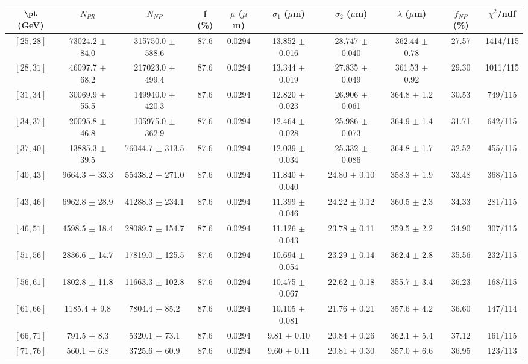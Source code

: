 \begin{tabular}{c||c|c|c|c|c|c|c||c|c}
$\pt$ (GeV) & $N_{PR}$ & $N_{NP}$ & f (\%) & $\mu$ ($\mu$m) & $\sigma_1$ ($\mu$m) & $\sigma_2$ ($\mu$m)  & $\lambda$ ($\mu$m) & $f_{NP}$ (\%) & $\chi^2$/ndf \\
\hline
$[25, 28]$ & 73024.2 $\pm$ 84.0 & 315750.0 $\pm$ 588.6 & 87.6 & 0.0294 & 13.852 $\pm$ 0.016 & 28.747 $\pm$ 0.040 & 362.44 $\pm$ 0.78 & 27.57 & 1414/115\\
$[28, 31]$ & 46097.7 $\pm$ 68.2 & 217023.0 $\pm$ 499.4 & 87.6 & 0.0294 & 13.344 $\pm$ 0.019 & 27.835 $\pm$ 0.049 & 361.53 $\pm$ 0.92 & 29.30 & 1011/115\\
$[31, 34]$ & 30069.9 $\pm$ 55.5 & 149940.0 $\pm$ 420.3 & 87.6 & 0.0294 & 12.820 $\pm$ 0.023 & 26.906 $\pm$ 0.061 & 364.8 $\pm$ 1.2 & 30.53 & 749/115\\
$[34, 37]$ & 20095.8 $\pm$ 46.8 & 105975.0 $\pm$ 362.9 & 87.6 & 0.0294 & 12.464 $\pm$ 0.028 & 25.986 $\pm$ 0.073 & 364.9 $\pm$ 1.4 & 31.71 & 642/115\\
$[37, 40]$ & 13885.3 $\pm$ 39.5 & 76044.7 $\pm$ 313.5 & 87.6 & 0.0294 & 12.039 $\pm$ 0.034 & 25.332 $\pm$ 0.086 & 364.8 $\pm$ 1.7 & 32.52 & 455/115\\
$[40, 43]$ & 9664.3 $\pm$ 33.3 & 55438.2 $\pm$ 271.0 & 87.6 & 0.0294 & 11.840 $\pm$ 0.040 & 24.80 $\pm$ 0.10 & 358.3 $\pm$ 1.9 & 33.48 & 368/115\\
$[43, 46]$ & 6962.8 $\pm$ 28.9 & 41288.3 $\pm$ 234.1 & 87.6 & 0.0294 & 11.399 $\pm$ 0.046 & 24.22 $\pm$ 0.12 & 360.5 $\pm$ 2.3 & 34.33 & 281/115\\
$[46, 51]$ & 4598.5 $\pm$ 18.4 & 28089.7 $\pm$ 154.7 & 87.6 & 0.0294 & 11.126 $\pm$ 0.043 & 23.78 $\pm$ 0.11 & 359.5 $\pm$ 2.2 & 34.90 & 307/115\\
$[51, 56]$ & 2836.6 $\pm$ 14.7 & 17819.0 $\pm$ 125.5 & 87.6 & 0.0294 & 10.694 $\pm$ 0.054 & 23.29 $\pm$ 0.14 & 362.4 $\pm$ 2.8 & 35.56 & 232/115\\
$[56, 61]$ & 1802.8 $\pm$ 11.8 & 11663.3 $\pm$ 102.8 & 87.6 & 0.0294 & 10.475 $\pm$ 0.067 & 22.62 $\pm$ 0.18 & 355.7 $\pm$ 3.4 & 36.23 & 168/115\\
$[61, 66]$ & 1185.4 $\pm$ 9.8 & 7804.4 $\pm$ 85.2 & 87.6 & 0.0294 & 10.105 $\pm$ 0.081 & 21.76 $\pm$ 0.21 & 357.6 $\pm$ 4.2 & 36.60 & 147/114\\
$[66, 71]$ & 791.5 $\pm$ 8.3 & 5320.1 $\pm$ 73.1 & 87.6 & 0.0294 & 9.81 $\pm$ 0.10 & 20.84 $\pm$ 0.26 & 362.1 $\pm$ 5.4 & 37.12 & 161/115\\
$[71, 76]$ & 560.1 $\pm$ 6.8 & 3725.6 $\pm$ 60.9 & 87.6 & 0.0294 & 9.60 $\pm$ 0.11 & 20.81 $\pm$ 0.30 & 357.0 $\pm$ 6.6 & 36.95 & 123/113\\

\end{tabular}
